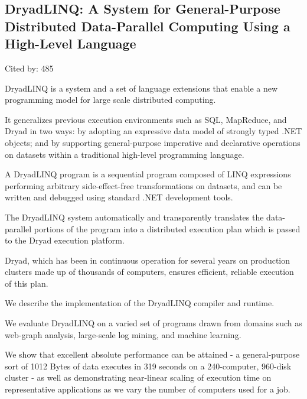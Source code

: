 \documentclass[a4paper,11pt]{article}
\begin{document}
\subsection*{DryadLINQ: A System for General-Purpose Distributed Data-Parallel Computing 
Using a High-Level Language}
{\color{cyan} {\color{magenta} Cited by: 485}

{\color{black} DryadLINQ\cite{dryadlinq}} 
is a system and a set of language extensions that 
enable a new programming model for large scale distributed computing. 

It generalizes previous execution environments such as SQL, MapReduce, and Dryad 
in two ways: 
by adopting an expressive data model of strongly typed .NET objects; and 
by supporting general-purpose imperative and declarative operations on datasets 
within a traditional high-level programming language.

A DryadLINQ program 
is a sequential program composed of 
LINQ expressions performing arbitrary side-effect-free transformations on datasets, and 
can be written and debugged using standard .NET development tools. 

The DryadLINQ system 
automatically and transparently 
translates the data-parallel portions of the program 
into a distributed execution plan which is passed to the Dryad execution platform. 

Dryad, 
which has been in continuous operation for several years on production clusters made up of thousands of computers, 
ensures efficient, reliable execution of this plan.


We describe the 
implementation of the DryadLINQ compiler and runtime. 

We evaluate DryadLINQ on a varied set of programs drawn from 
domains such as web-graph analysis, large-scale log mining, and machine learning. 

We show that 
excellent absolute performance can be attained - 
a general-purpose sort of 1012 Bytes of data executes in 319 seconds on a 240-computer, 960-disk cluster - 
as well as demonstrating near-linear scaling of execution time on representative applications as 
we vary the number of computers used for a job.

}
\end{document}
